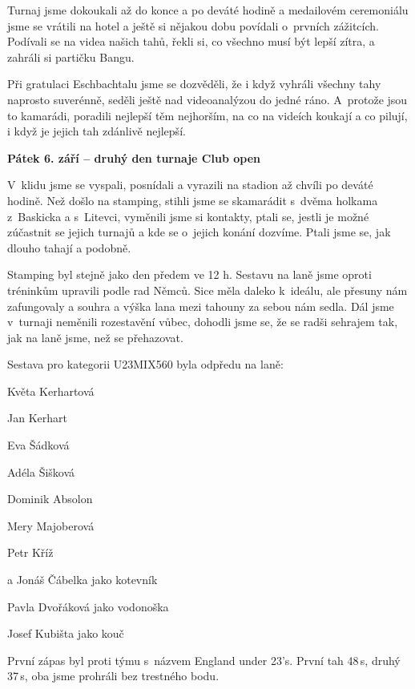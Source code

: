 \documentclass[11pt]{article}
\begin{document}
Turnaj jsme dokoukali až do konce a po deváté hodině a medailovém ceremoniálu jsme se vrátili na hotel a ještě si nějakou dobu povídali o~prvních zážitcích. Podívali se na videa našich tahů, řekli si, co všechno musí být lepší zítra, a zahráli si partičku Bangu.

Při gratulaci Eschbachtalu jsme se dozvěděli, že i když vyhráli všechny tahy naprosto suverénně, seděli ještě nad videoanalýzou do jedné ráno. A~protože jsou to kamarádi, poradili nejlepší těm nejhorším, na co na videích koukají a co pilují, i když je jejich tah zdánlivě nejlepší.

\vspace*{12pt}
\noindent\textbf{Pátek 6. září – druhý den turnaje Club open}
\vspace*{6pt}

\noindent
V~klidu jsme se vyspali, posnídali a vyrazili na stadion až chvíli po deváté hodině. Než došlo na stamping, stihli jsme se skamarádit s~dvěma holkama z~Baskicka a s~Litevci, vyměnili jsme si kontakty, ptali se, jestli je možné zúčastnit se jejich turnajů a kde se o~jejich konání dozvíme. Ptali jsme se, jak dlouho tahají a podobně.

Stamping byl stejně jako den předem ve 12 h. Sestavu na laně jsme oproti tréninkům upravili podle rad Němců. Sice měla daleko k~ideálu, ale přesuny nám zafungovaly a souhra a výška lana mezi tahouny za sebou nám sedla. Dál jsme v~turnaji neměnili rozestavění vůbec, dohodli jsme se, že se radši sehrajem tak, jak na laně jsme, než se přehazovat.

Sestava pro kategorii U23MIX560 byla odpředu na laně:

\vspace*{6pt}
Květa Kerhartová

Jan Kerhart

Eva Šádková

Adéla Šišková

Dominik Absolon

Mery Majoberová

Petr Kříž

a Jonáš Čábelka jako kotevník

\vspace*{6pt}

Pavla Dvořáková jako vodonoška

Josef Kubišta jako kouč

\vspace*{6pt}

První zápas byl proti týmu s~názvem England under 23's. První tah 48\,s, druhý 37\,s, oba jsme prohráli bez trestného bodu.
\end{document}
